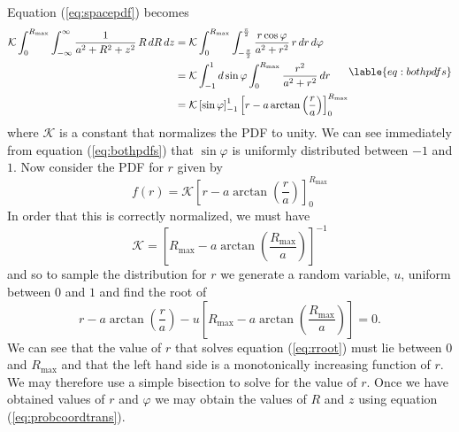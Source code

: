 Equation (\ref{eq:spacepdf}) becomes
\begin{equation}
\begin{split}
\mathcal{K} \int_0^{R_\mathrm{max}}\int_{-\infty}^{\infty} \frac{1}{a^2 + R^2 + z^2}\,R\, dR\, dz 
&= \mathcal{K} \int_0^{R_{\mathrm{max}}}\int_{-\frac{\pi}{2}}^{\frac{\pi}{2}} \frac{r\cos\varphi}{a^2+r^2}\,r\, dr \, d\varphi \\
&= \mathcal{K} \int_{-1}^{1} d\sin\varphi \int_0^{R_{\mathrm{max}}} \frac{r^2}{a^2+r^2}\, dr \\
&= \mathcal{K} \left[\sin\varphi\right]_{-1}^1 \left[r -
a\arctan\left(\frac{r}{a}\right)\right]_0^{R_{\mathrm{max}}}
\end{split}
\lable{eq:bothpdfs}
\end{equation}
where $\mathcal{K}$ is a constant that normalizes the PDF to unity. We can see
immediately from equation (\ref{eq:bothpdfs}) that $\sin\varphi$ is uniformly
distributed between $-1$ and $1$. Now consider the PDF for $r$ given by
\begin{equation}
f(r) = \mathcal{K} \left[r - a\arctan\left(\frac{r}{a}\right)\right]_0^{R_{\mathrm{max}}}
\end{equation}
In order that this is correctly normalized, we must have
\begin{equation}
\mathcal{K} = 
\left[R_\mathrm{max} -
a\arctan\left(\frac{R_\mathrm{max}}{a}\right)\right]^{-1}
\end{equation}
and so to sample the distribution for $r$ we generate a random variable, $u$,
uniform between $0$ and $1$ and find the root of
\begin{equation}
r - a\arctan\left(\frac{r}{a}\right) - u \left[R_\mathrm{max} -
a\arctan\left(\frac{R_\mathrm{max}}{a}\right)\right] = 0.
\label{eq:rroot}
\end{equation}
We can see that the value of $r$ that solves equation (\ref{eq:rroot}) must
lie between $0$ and $R_\mathrm{max}$ and that the left hand side is a
monotonically increasing function of $r$. We may therefore use a simple 
bisection to solve for the value of $r$. Once we have obtained values of $r$
and $\varphi$ we may obtain the values of $R$ and $z$ using equation
(\ref{eq:probcoordtrans}). 


